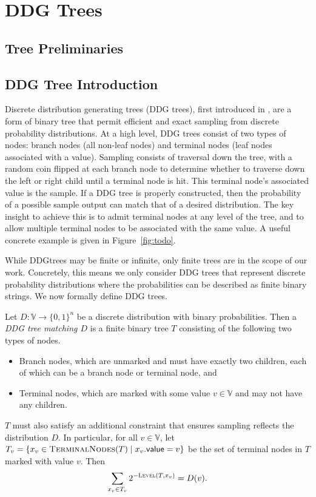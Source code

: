 \section{DDG Trees} \label{sec:ddg-trees}

\subsection{Tree Preliminaries}

\subsection{DDG Tree Introduction}

Discrete distribution generating trees (DDG trees), first introduced in \cite{ALGCPLX:KnuYao76}, are a form of binary tree that permit efficient and exact sampling from discrete probability distributions.
At a high level, DDG trees consist of two types of nodes: branch nodes (all non-leaf nodes) and terminal nodes (leaf nodes associated with a value). 
Sampling consists of traversal down the tree, with a random coin flipped at each branch node to determine whether to traverse down the left or right child until a terminal node is hit.
This terminal node's associated value is the sample.
If a DDG tree is properly constructed, then the probability of a possible sample output can match that of a desired distribution. 
The key insight to achieve this is to admit terminal nodes at any level of the tree, and to allow multiple terminal nodes to be associated with the same value.
A useful concrete example is given in Figure~\ref{fig:todo}.

While DDGtrees may be finite or infinite, only finite trees are in the scope of our work.
Concretely, this means we only consider DDG trees that represent discrete probability distributions where the probabilities can be described as finite binary strings. 
We now formally define DDG trees.

\begin{definition}
Let $D:\mathbb{V} \to \{0, 1\}^n$ be a discrete distribution with binary probabilities. Then a \emph{DDG tree matching $D$} is a finite binary tree $T$ consisting of the following two types of nodes.
\begin{itemize}
	\item Branch nodes, which are unmarked and must have exactly two children, each of which can be a branch node or terminal node, and
	\item Terminal nodes, which are marked with some value $v \in \mathbb{V}$ and may not have any children.
\end{itemize}
$T$ must also satisfy an additional constraint that ensures sampling reflects the distribution $D$. In particular, for all $v \in \mathbb{V}$, let $T_v = \{ x_v \in \textsc{TerminalNodes}(T) \mid x_v.\mathsf{value} = v\}$ be the set of terminal nodes in $T$ marked with value $v$. Then
$$ \sum_{x_v \in T_v} 2^{-\textsc{Level}(T, x_v)} = D(v).$$
\end{definition}

